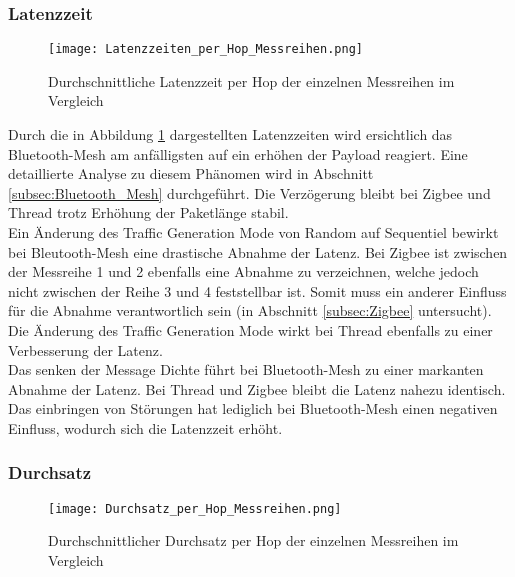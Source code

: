 \subsubsection{Latenzzeit}\label{subsec:VergleichLatenzzeitMessreihen}

\begin{figure}[H]
	\centering
	\texttt{[image: Latenzzeiten\_per\_Hop\_Messreihen.png]}
	\caption{Durchschnittliche Latenzzeit per Hop der einzelnen Messreihen im Vergleich}\label{fig:Latenzzeiten_per_Hop_Messreihen}
\end{figure}

Durch die in Abbildung \ref{fig:Latenzzeiten_per_Hop_Messreihen} dargestellten Latenzzeiten wird ersichtlich das Bluetooth-Mesh am anfälligsten auf ein erhöhen der Payload reagiert. Eine detaillierte Analyse zu diesem Phänomen wird in Abschnitt \ref{subsec:Bluetooth_Mesh} durchgeführt. Die Verzögerung bleibt bei Zigbee und Thread trotz Erhöhung der Paketlänge stabil. \\

Ein Änderung des Traffic Generation Mode von Random auf Sequentiel bewirkt bei Bleutooth-Mesh eine drastische Abnahme der Latenz. Bei Zigbee ist zwischen der Messreihe 1 und 2 ebenfalls eine Abnahme zu verzeichnen, welche jedoch nicht zwischen der Reihe 3 und 4 feststellbar ist. Somit muss ein anderer Einfluss für die Abnahme verantwortlich sein (in Abschnitt \ref{subsec:Zigbee} untersucht). Die Änderung des Traffic Generation Mode wirkt bei Thread ebenfalls zu einer Verbesserung der Latenz.\\

 Das senken der Message Dichte führt bei Bluetooth-Mesh zu einer markanten Abnahme der Latenz. Bei Thread und Zigbee bleibt die Latenz nahezu identisch. \\
 
 Das einbringen von Störungen hat lediglich bei Bluetooth-Mesh einen negativen Einfluss, wodurch sich die Latenzzeit erhöht. 

\subsubsection{Durchsatz}\label{subsec:VergleichDurchsatzMessreihen}


\begin{figure}[H]
	\centering
	\texttt{[image: Durchsatz\_per\_Hop\_Messreihen.png]}
	\caption{Durchschnittlicher Durchsatz per Hop der einzelnen Messreihen im Vergleich}\label{fig:Durchsätze_per_Hop_Messreihen}
\end{figure}


